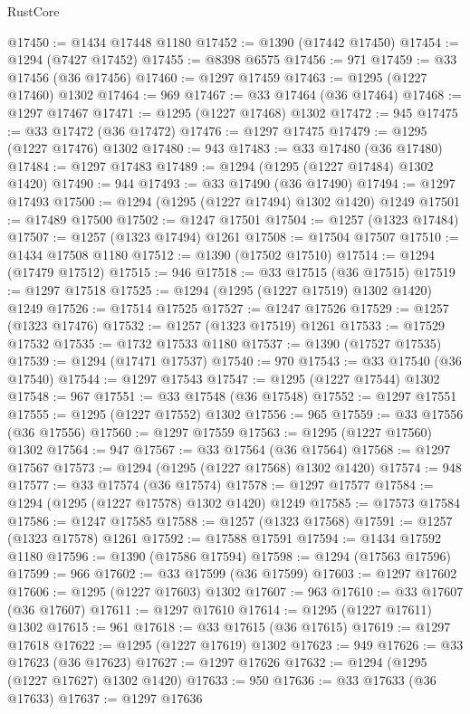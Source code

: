\begin{lexlean}{RustCore}
\begin{coremodule}
@17450 := @1434 @17448 @1180
@17452 := @1390 (@17442 @17450)
@17454 := @1294 (@7427 @17452)
@17455 := @8398 @6575
@17456 := 971
@17459 := @33 @17456 (@36 @17456)
@17460 := @1297 @17459
@17463 := @1295 (@1227 @17460) @1302
@17464 := 969
@17467 := @33 @17464 (@36 @17464)
@17468 := @1297 @17467
@17471 := @1295 (@1227 @17468) @1302
@17472 := 945
@17475 := @33 @17472 (@36 @17472)
@17476 := @1297 @17475
@17479 := @1295 (@1227 @17476) @1302
@17480 := 943
@17483 := @33 @17480 (@36 @17480)
@17484 := @1297 @17483
@17489 := @1294 (@1295 (@1227 @17484) @1302 @1420)
@17490 := 944
@17493 := @33 @17490 (@36 @17490)
@17494 := @1297 @17493
@17500 := @1294 (@1295 (@1227 @17494) @1302 @1420) @1249
@17501 := @17489 @17500
@17502 := @1247 @17501
@17504 := @1257 (@1323 @17484)
@17507 := @1257 (@1323 @17494) @1261
@17508 := @17504 @17507
@17510 := @1434 @17508 @1180
@17512 := @1390 (@17502 @17510)
@17514 := @1294 (@17479 @17512)
@17515 := 946
@17518 := @33 @17515 (@36 @17515)
@17519 := @1297 @17518
@17525 := @1294 (@1295 (@1227 @17519) @1302 @1420) @1249
@17526 := @17514 @17525
@17527 := @1247 @17526
@17529 := @1257 (@1323 @17476)
@17532 := @1257 (@1323 @17519) @1261
@17533 := @17529 @17532
@17535 := @1732 @17533 @1180
@17537 := @1390 (@17527 @17535)
@17539 := @1294 (@17471 @17537)
@17540 := 970
@17543 := @33 @17540 (@36 @17540)
@17544 := @1297 @17543
@17547 := @1295 (@1227 @17544) @1302
@17548 := 967
@17551 := @33 @17548 (@36 @17548)
@17552 := @1297 @17551
@17555 := @1295 (@1227 @17552) @1302
@17556 := 965
@17559 := @33 @17556 (@36 @17556)
@17560 := @1297 @17559
@17563 := @1295 (@1227 @17560) @1302
@17564 := 947
@17567 := @33 @17564 (@36 @17564)
@17568 := @1297 @17567
@17573 := @1294 (@1295 (@1227 @17568) @1302 @1420)
@17574 := 948
@17577 := @33 @17574 (@36 @17574)
@17578 := @1297 @17577
@17584 := @1294 (@1295 (@1227 @17578) @1302 @1420) @1249
@17585 := @17573 @17584
@17586 := @1247 @17585
@17588 := @1257 (@1323 @17568)
@17591 := @1257 (@1323 @17578) @1261
@17592 := @17588 @17591
@17594 := @1434 @17592 @1180
@17596 := @1390 (@17586 @17594)
@17598 := @1294 (@17563 @17596)
@17599 := 966
@17602 := @33 @17599 (@36 @17599)
@17603 := @1297 @17602
@17606 := @1295 (@1227 @17603) @1302
@17607 := 963
@17610 := @33 @17607 (@36 @17607)
@17611 := @1297 @17610
@17614 := @1295 (@1227 @17611) @1302
@17615 := 961
@17618 := @33 @17615 (@36 @17615)
@17619 := @1297 @17618
@17622 := @1295 (@1227 @17619) @1302
@17623 := 949
@17626 := @33 @17623 (@36 @17623)
@17627 := @1297 @17626
@17632 := @1294 (@1295 (@1227 @17627) @1302 @1420)
@17633 := 950
@17636 := @33 @17633 (@36 @17633)
@17637 := @1297 @17636

\end{coremodule}
\end{lexlean}
